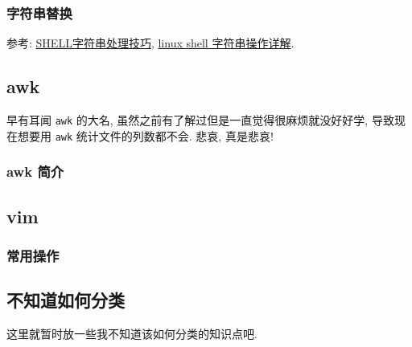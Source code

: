 \subsubsection{字符串替换}

参考: \href{https://blog.csdn.net/qq_51470638/article/details/125035162}{SHELL字符串处理技巧}, \href{https://www.cnblogs.com/gaochsh/p/6901809.html}{linux shell 字符串操作详解}.

\subsection{awk}
早有耳闻 \texttt{awk} 的大名, 虽然之前有了解过但是一直觉得很麻烦就没好好学, 导致现在想要用 \texttt{awk} 统计文件的列数都不会. 悲哀, 真是悲哀!

\subsubsection{awk 简介}


\subsection{vim}
\subsubsection{常用操作}

\subsection{不知道如何分类}
这里就暂时放一些我不知道该如何分类的知识点吧.

